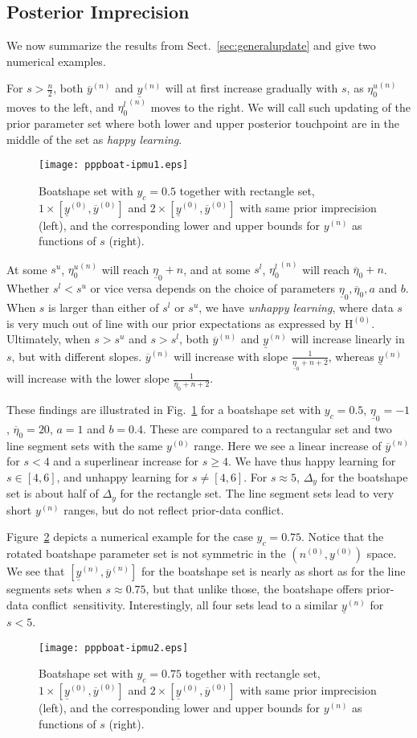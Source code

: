 \documentclass[runningheads,a4paper]{llncs}
\def\pdc{prior-data conflict}
\newcommand{\uz}{^{(0)}} %
\newcommand{\un}{^{(n)}} %
\newcommand{\ul}[1]{\underline{#1}}
\newcommand{\ol}[1]{\overline{#1}}
\def\yz{y\uz}
\def\yn{y\un}
\def\yzl{\ul{y}\uz}
\def\yzu{\ol{y}\uz}
\def\ynl{\ul{y}\un}
\def\ynu{\ol{y}\un}
\def\nz{n\uz}
\def\EZ{\mathrm{H}\uz}
\def\ezl{\ul{\eta}_0}
\def\ezu{\ol{\eta}_0}
\begin{document}
\subsection{Posterior Imprecision}
\label{sec:posteriorimprecision}

We now summarize the results from Sect.~\ref{sec:generalupdate}
and give two numerical examples.

For $s > \frac{n}{2}$, both $\ynu$ and $\ynl$ will at first increase gradually with $s$,
as ${\eta_0^u}\un$ moves to the left, and ${\eta_0^l}\un$ moves to the right.
We will call such updating of the prior parameter set
where both lower and upper posterior touchpoint are in the middle of the set as \emph{happy learning}.
\begin{figure}
\texttt{[image: pppboat-ipmu1.eps]}
\caption{Boatshape set with $y_c = 0.5$ together with rectangle set, $1 \times [\yzl, \yzu]$ and $2 \times [\yzl, \yzu]$
with same prior imprecision (left),
and the corresponding lower and upper bounds for $\yn$ as functions of $s$ (right).}
\label{fig:ppp1}
\end{figure}
%
At some $s^u$, ${\eta_0^u}\un$ will reach $\ezl + n$,
and at some $s^l$, ${\eta_0^l}\un$ will reach $\ezu + n$.
Whether $s^l < s^u$ or vice versa depends on
the choice of parameters $\ezl, \ezu, a$ and $b$.
When $s$ is larger than either of $s^l$ or $s^u$,
we have \emph{unhappy learning},
where data $s$ is very much out of line with our prior expectations as expressed by $\EZ$.
Ultimately, when $s > s^u$ and $s > s^l$,
both $\ynu$ and $\ynl$ will increase linearly in $s$, but with different slopes.
$\ynu$ will increase with slope $\frac{1}{\ezl + n + 2}$,
whereas $\ynl$ will increase with the lower slope $\frac{1}{\ezu + n + 2}$.

These findings are illustrated in Fig.~\ref{fig:ppp1}
for a boatshape set with $y_c = 0.5$, $\ezl = -1$, $\ezu = 20$, $a=1$ and $b=0.4$. 
These are compared to a rectangular set and two line segment sets with the same $\yz$ range.
Here we see a linear increase of $\ynu$ for $s < 4$ and a superlinear increase for $s \ge 4$.
We have thus happy learning for $s \in [4,6]$, and unhappy learning for $s \neq [4,6]$.
For $s \approx 5$, $\Delta_y$ for the boatshape set is about half of $\Delta_y$ for the rectangle set.
The line segment sets lead to very short $\yn$ ranges, but do not reflect \pdc.

Figure~\ref{fig:ppp2} depicts a numerical example for the case $y_c = 0.75$.
Notice that the rotated boatshape parameter set is not symmetric in the $(\nz, \yz)$ space.
We see that $[\ynl, \ynu]$ for the boatshape set is nearly as short as for the line segments sets
when $s \approx 0.75$, but that unlike those, the boatshape offers \pdc\ sensitivity.
Interestingly, all four sets lead to a similar $\ynl$ for $s < 5$.
\begin{figure}
\texttt{[image: pppboat-ipmu2.eps]}
\caption{Boatshape set with $y_c = 0.75$ together with rectangle set, $1 \times [\yzl, \yzu]$ and $2 \times [\yzl, \yzu]$
with same prior imprecision (left),
and the corresponding lower and upper bounds for $\yn$ as functions of $s$ (right).}
\label{fig:ppp2}
\end{figure}
\end{document}

